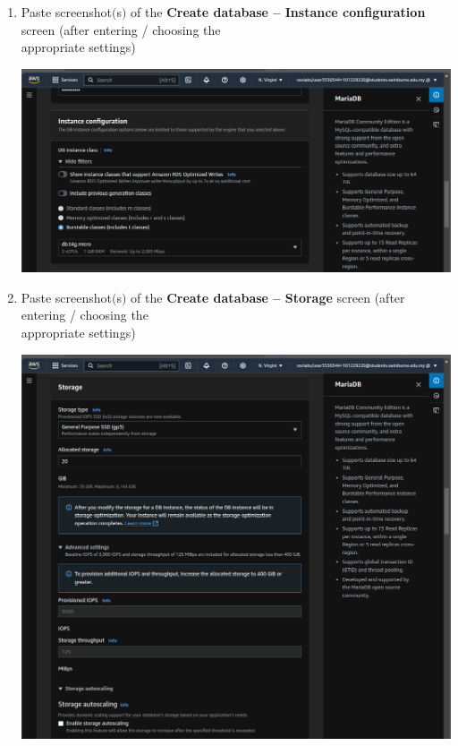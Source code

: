\documentclass[11pt]{article}
\begin{document}
\begin{enumerate}[resume]
    \item Paste screenshot$($s$)$ of the \textbf{Create database – Instance configuration} screen (after entering / choosing the \\ appropriate settings) \\
    \vspace{5mm}

    {\centering
    \includegraphics[width=5.8in]{pics/28.png}
    }


    \item Paste screenshot$($s$)$ of the \textbf{Create database – Storage} screen (after entering / choosing the \\ appropriate settings) \\
    \vspace{5mm}

    {\centering
    \includegraphics[width=5.8in]{pics/29.png}
    }


\end{enumerate}
\end{document}
